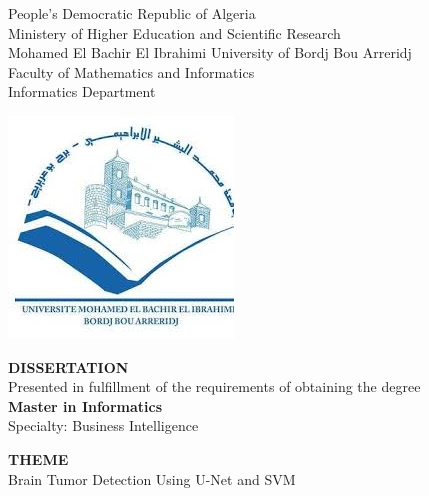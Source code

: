
\thispagestyle{empty}
\begin{center}
  \begin{spacing}{1.15}
    People’s Democratic Republic of Algeria \\
    Ministery of Higher Education and Scientific Research \\
    Mohamed El Bachir El Ibrahimi University of Bordj Bou Arreridj\\
    Faculty of Mathematics and Informatics\\
    Informatics Department\\
    \vspace{0.5cm}

    \includegraphics[scale=0.5]{Images/logo.jpeg}


    \fontsize{13}{15}\selectfont \textbf{DISSERTATION}\\
    Presented in fulfillment of the requirements of obtaining the degree\\
    \fontsize{13}{15}\selectfont \textbf{Master in Informatics} \\
    Specialty: Business Intelligence\\


    \vspace{1.5cm}

    \fontsize{19}{22}\selectfont \textbf{THEME} \\
    \fontsize{19}{22}\selectfont Brain Tumor Detection Using U-Net and SVM\\

  \end{spacing}
\end{center}

\vspace{0.5cm}


